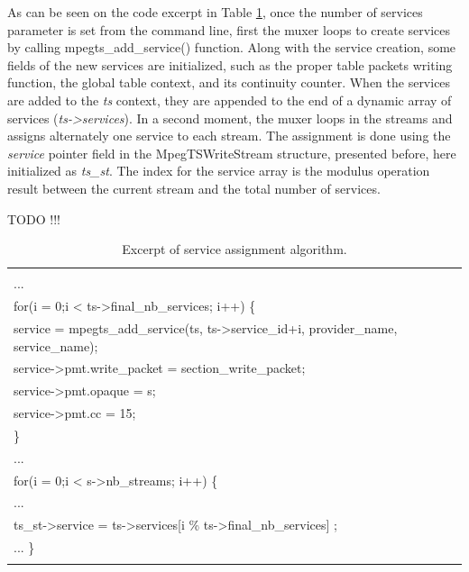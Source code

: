 \documentclass[
	12pt,				%
	openright,			%
	twoside,			%
	a4paper,			%
	brazil,
	french,				%
	english
	]{abntex2}
\begin{document}
As can be seen on the code excerpt in Table \ref{tab_service_assignment}, once the number of services parameter is set from the command line, first the muxer loops to create services by calling mpegts\_add\_service() function. Along with the service creation, some fields of the new services are initialized, such as the proper table packets writing function, the global table context, and its continuity counter. When the services are added to the \textit{ts} context, they are appended to the end of a dynamic array of services (\textit{ts->services}). In a second moment, the muxer loops in the streams and assigns alternately one service to each stream. The assignment is done using the \textit{service} pointer field in the MpegTSWriteStream structure, presented before, here initialized as \textit{ts\_st}. The index for the service array is the modulus operation result between the current stream and the total number of services.

TODO !!!

\begin{table}[!htpd]
\label{tab_service_assignment}
\caption{ Excerpt of service assignment algorithm.}
\begin{center}
\begin{tabular}{|l|}
\hline
\\
...\\
for(i = 0;i < ts->final_nb_services; i++) \{\\
service = mpegts\_add\_service(ts, ts->service\_id+i, provider\_name, service\_name);\\
service->pmt.write\_packet = section\_write\_packet;\\
service->pmt.opaque = s;\\
service->pmt.cc = 15;\\
\}\\
...\\
for(i = 0;i < s->nb\_streams; i++) \{\\
...\\
ts\_st->service = ts->services[i \% ts->final\_nb\_services] ;\\
...
\}\\
\\
\hline
\end{tabular}
\end{center}
\end{table}

\end{document}
